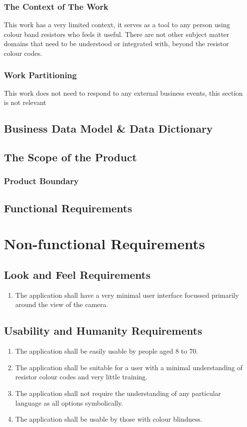 \documentclass{article}
\begin{document}
\subsubsection{The Context of The Work}

This work has a very limited context, it serves as a tool to any person using colour band resistors who feels it useful.
There are not other subject matter domains that need to be understood or integrated with, beyond the resistor colour codes.

\subsubsection{Work Partitioning}

This work does not need to respond to any external business events, this section is not relevant

\subsection{Business Data Model \& Data Dictionary}
\subsection{The Scope of the Product}

\subsubsection{Product Boundary}


\subsection{Functional Requirements}


\section{Non-functional Requirements}

\subsection{Look and Feel Requirements }
\begin{enumerate}
\item The application shall have a very minimal user interface focussed primarily around the view of the camera.
\end{enumerate}
\subsection{Usability and Humanity Requirements}
\begin{enumerate}
\item The application shall be easily usable by people aged 8 to 70.
\item The application shall be suitable for a user with a minimal understanding of resistor colour codes and very little training.
\item The application shall not require the understanding of any particular language as all options symbolically.
\item The application shall be usable by those with colour blindness.
\end{enumerate}
\end{document}
